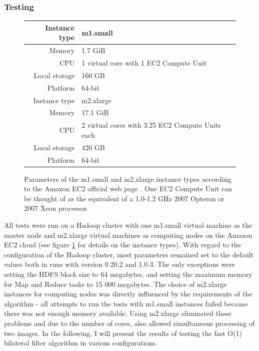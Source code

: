 \documentclass [12pt,a4paper]{report}
\begin{document}
\subsubsection{Testing}

\begin{figure}[h]
\begin{center}
\begin{tabular}{r | l}
Instance type & m1.small \\
\hline
Memory & 1.7 GiB \\
CPU & 1 virtual core with 1 EC2 Compute Unit \\
Local storage & 160 GB \\
Platform & 64-bit \\
\hline\hline
Instance type & m2.xlarge \\
\hline
Memory & 17.1 GiB \\
CPU & 2 virtual cores with 3.25 EC2 Compute Units each \\
Local storage & 420 GB \\
Platform & 64-bit \\
\end{tabular}
\caption[Parameters of the m1.small and m2.xlarge instance types]{Parameters of the m1.small and m2.xlarge instance types according to the Amazon EC2 official web page \cite{ec2_instancetypes}. One EC2 Compute Unit can be thought of as the equivalent of a 
1.0-1.2 GHz 2007 Opteron or 2007 Xeon processor.}
\label{fig_instance_types}
\end{center}
\end{figure}

All tests were run on a Hadoop cluster with one m1.small virtual machine as the master node and m2.xlarge virtual machines as computing nodes on the Amazon EC2 cloud (see figure \ref{fig_instance_types} for details on the instance types). With regard to the configuration of the Hadoop cluster, most parameters remained set to the default values both in runs with version 0.20.2 and 1.0.3. The only exceptions were setting the HDFS block size to 64 megabytes, and setting the maximum memory for Map and Reduce tasks to 15 000 megabytes. The choice of m2.xlarge instances for computing nodes was directly influenced by the requirements of the algorithm - all attempts to run the tests with m1.small instances failed because there was not enough memory available. Using m2.xlarge eliminated these problems and due to the number of cores, also allowed simultaneous processing of two images. In the following, I will present the results of testing the fast O(1) bilateral filter algorithm in various configurations.
\end{document}
